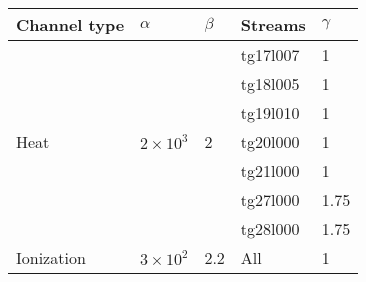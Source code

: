 \begin{tabular}{l|l|l|l|l}
Channel type                & $\alpha$                         & $\beta$              & Streams              & $\gamma$           \\ \hline \hline
\multirow{7}{*}{Heat}       & \multirow{7}{*}{$2 \times 10^3$} & \multirow{7}{*}{2}   & tg17l007             & 1                  \\
 &  &  & tg18l005 & 1    \\
 &  &  & tg19l010 & 1    \\
 &  &  & tg20l000 & 1    \\
 &  &  & tg21l000 & 1    \\
 &  &  & tg27l000 & 1.75 \\
 &  &  & tg28l000 & 1.75 \\ \hline
\multirow{7}{*}{Ionization} & \multirow{7}{*}{$3 \times 10^2$} & \multirow{7}{*}{2.2} & \multirow{7}{*}{All} & \multirow{7}{*}{1} \\
 &  &  &          &      \\
 &  &  &          &      \\
 &  &  &          &      \\
 &  &  &          &      \\
 &  &  &          &      \\
 &  &  &          &     
\end{tabular}